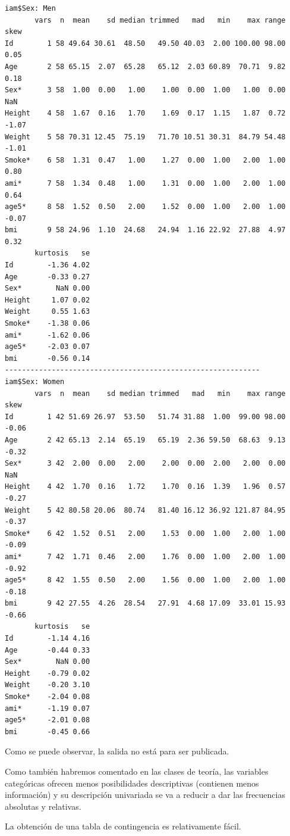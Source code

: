 \documentclass[
  letterpaper,
  DIV=11,
  numbers=noendperiod]{scrreprt}
\begin{document}
\begin{verbatim}
iam$Sex: Men
       vars  n  mean    sd median trimmed   mad   min    max range  skew
Id        1 58 49.64 30.61  48.50   49.50 40.03  2.00 100.00 98.00  0.05
Age       2 58 65.15  2.07  65.28   65.12  2.03 60.89  70.71  9.82  0.18
Sex*      3 58  1.00  0.00   1.00    1.00  0.00  1.00   1.00  0.00   NaN
Height    4 58  1.67  0.16   1.70    1.69  0.17  1.15   1.87  0.72 -1.07
Weight    5 58 70.31 12.45  75.19   71.70 10.51 30.31  84.79 54.48 -1.01
Smoke*    6 58  1.31  0.47   1.00    1.27  0.00  1.00   2.00  1.00  0.80
ami*      7 58  1.34  0.48   1.00    1.31  0.00  1.00   2.00  1.00  0.64
age5*     8 58  1.52  0.50   2.00    1.52  0.00  1.00   2.00  1.00 -0.07
bmi       9 58 24.96  1.10  24.68   24.94  1.16 22.92  27.88  4.97  0.32
       kurtosis   se
Id        -1.36 4.02
Age       -0.33 0.27
Sex*        NaN 0.00
Height     1.07 0.02
Weight     0.55 1.63
Smoke*    -1.38 0.06
ami*      -1.62 0.06
age5*     -2.03 0.07
bmi       -0.56 0.14
------------------------------------------------------------ 
iam$Sex: Women
       vars  n  mean    sd median trimmed   mad   min    max range  skew
Id        1 42 51.69 26.97  53.50   51.74 31.88  1.00  99.00 98.00 -0.06
Age       2 42 65.13  2.14  65.19   65.19  2.36 59.50  68.63  9.13 -0.32
Sex*      3 42  2.00  0.00   2.00    2.00  0.00  2.00   2.00  0.00   NaN
Height    4 42  1.70  0.16   1.72    1.70  0.16  1.39   1.96  0.57 -0.27
Weight    5 42 80.58 20.06  80.74   81.40 16.12 36.92 121.87 84.95 -0.37
Smoke*    6 42  1.52  0.51   2.00    1.53  0.00  1.00   2.00  1.00 -0.09
ami*      7 42  1.71  0.46   2.00    1.76  0.00  1.00   2.00  1.00 -0.92
age5*     8 42  1.55  0.50   2.00    1.56  0.00  1.00   2.00  1.00 -0.18
bmi       9 42 27.55  4.26  28.54   27.91  4.68 17.09  33.01 15.93 -0.66
       kurtosis   se
Id        -1.14 4.16
Age       -0.44 0.33
Sex*        NaN 0.00
Height    -0.79 0.02
Weight    -0.20 3.10
Smoke*    -2.04 0.08
ami*      -1.19 0.07
age5*     -2.01 0.08
bmi       -0.45 0.66
\end{verbatim}

Como se puede observar, la salida no está para ser publicada.

Como también habremos comentado en las clases de teoría, las variables
categóricas ofrecen menos posibilidades descriptivas (contienen menos
información) y su descripción univariada se va a reducir a dar las
frecuencias absolutas y relativas.

La obtención de una tabla de contingencia es relativamente fácil.
\end{document}
